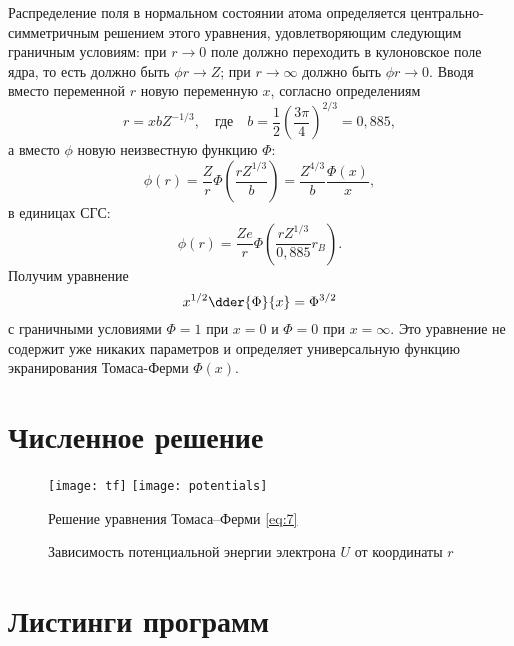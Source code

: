   Распределение поля в нормальном состоянии атома определяется
  центрально-симметричным решением этого уравнения, удовлетворяющим следующим
  граничным условиям: при \( r \to 0 \) поле должно переходить в кулоновское
  поле ядра, то есть должно быть \( \phi r \to Z \); при \( r \to \infty \)
  должно быть \( \phi r \to 0 \). Вводя вместо переменной \( r \) новую
  переменную \( x \), согласно определениям
  \begin{equation}
    r = xbZ^{-1 / 3}, \quad\text{где}\quad b = \frac{1}{2} \left(
      \frac{3\pi}{4} \right)^{2 / 3} = 0,\!885,
    \label{eq:5}
  \end{equation}
  а вместо \( \phi \) новую неизвестную функцию \( \Phi \):
  \begin{equation}
    \phi(r) = \frac{Z}{r} \Phi \left( \frac{rZ^{1 / 3}}{b} \right) =
      \frac{Z^{4 / 3}}{b} \frac{\Phi(x)}{x},
    \label{eq:6}
  \end{equation}
  в единицах СГС:
  \[
    \phi(r) = \frac{Ze}{r} \Phi \left( \frac{rZ^{1 / 3}}{0,\!885}r_B \right).
  \]
  Получим уравнение
  \begin{equation}
    x^{1 / 2} \dder{\Phi}{x} = \Phi^{3 / 2}
    \label{eq:7}
  \end{equation}
  с граничными условиями \( \Phi = 1 \) при \( x = 0 \) и \( \Phi = 0 \) при
  \( x = \infty \). Это уравнение не содержит уже никаких параметров и
  определяет универсальную функцию экранирования Томаса-Ферми \( \Phi(x) \).

  \section{Численное решение}
  \begin{figure}[h!]
    \vspace{-1em} \hspace{-2em}
      \texttt{[image: tf]} \hspace{-3em}
      \texttt{[image: potentials]} \\
    \parbox{.49\textwidth}{\caption{Решение уравнения Томаса--Ферми
      \eqref{eq:7}} \label{fig:1}}
      \parbox{.49\textwidth}{\caption{Зависимость потенциальной энергии
      электрона \( U \) от координаты \( r \)} \label{fig:2}}
  \end{figure}
  \newpage
  \section{Листинги программ}
  

  \vspace{1.5em}
  
